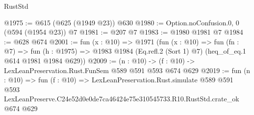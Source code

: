 \begin{lexlean}{RustStd}
\begin{coremodule}
@1975 := @615 (@625 (@1949 @23)) @630
@1980 := Option.noConfusion.{0, 0} (@594 (@1954 @23)) @7
@1981 := @207 @7
@1983 := @1980 @1981 @7
@1984 := @628 @674
@2001 := fun (x : @10) =>
  @1971
    (fun (x : @10) =>
    fun (fn : @7) =>
    fun (h : @1975) => @1983 @1984 (Eq.refl.{2} (Sort 1) @7) (heq_of_eq.{1} @614 @1981 @1984 @629))
@2009 := (n : @10) -> (f : @10) -> LexLeanPreservation.Rust.FunSem @589 @591 @593 @674 @629
@2019 := fun (n : @10) =>
  fun (f : @10) =>
  LexLeanPreservation.Rust.simulate
    @589
    @591
    @593
    LexLeanPreserve.C24e52d0e0de7ca46424e75e310545733.R10.RustStd.crate_ok
    @674
    @629
\end{coremodule}
\end{lexlean}
